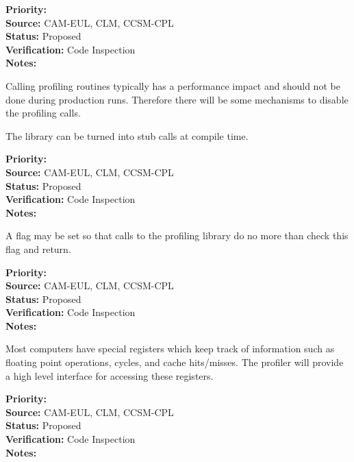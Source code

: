 \begin{reqlist}
{\bf Priority:}  \\
{\bf Source:} CAM-EUL, CLM, CCSM-CPL \\
{\bf Status:} Proposed \\
{\bf Verification:} Code Inspection \\
{\bf Notes:} 
\end{reqlist}


Calling profiling routines typically has a performance impact and should not
be done during production runs.  Therefore there will be some mechanisms to 
disable the profiling calls.


The library can be turned into stub calls at compile time.

\begin{reqlist}
{\bf Priority:}  \\
{\bf Source:} CAM-EUL, CLM, CCSM-CPL \\
{\bf Status:} Proposed \\
{\bf Verification:} Code Inspection \\
{\bf Notes:} 
\end{reqlist}


A flag may be set so that calls to the profiling library do no more than check
this flag and return.

\begin{reqlist}
{\bf Priority:}  \\
{\bf Source:} CAM-EUL, CLM, CCSM-CPL \\
{\bf Status:} Proposed \\
{\bf Verification:} Code Inspection \\
{\bf Notes:} 
\end{reqlist}


Most computers have special registers which keep track of information such
as floating point operations, cycles, and cache hits/misses.  The profiler will
provide a high level interface for accessing these registers.

\begin{reqlist}
{\bf Priority:}  \\
{\bf Source:} CAM-EUL, CLM, CCSM-CPL \\
{\bf Status:} Proposed \\
{\bf Verification:} Code Inspection \\
{\bf Notes:} 
\end{reqlist}

